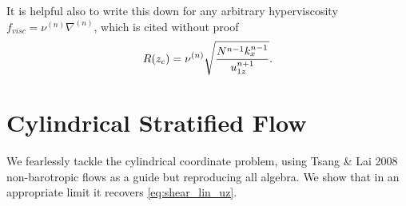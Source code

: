 \documentclass[11pt,
        usenames, %
        dvipsnames %
    ]{report}
\DeclarePairedDelimiter\p{\lparen}{\rparen}
\begin{document}
It is helpful also to write this down for any arbitrary hyperviscosity $f_{visc}
= \nu^{(n)} \nabla^{(n)}$, which is cited without proof
\begin{equation}
    R\p*{z_c} = \nu^{(n)} \sqrt{\frac{N^{n - 1}k_x^{n - 1}}{u_{1z}^{n + 1}}}.
\end{equation}

\chapter{Cylindrical Stratified Flow}

We fearlessly tackle the cylindrical coordinate problem, using Tsang \& Lai 2008
non-barotropic flows as a guide but reproducing all algebra. We show that in an
appropriate limit it recovers \autoref{eq:shear_lin_uz}.
\end{document}

